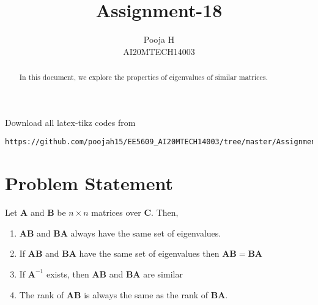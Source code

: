 \documentclass[journal,12pt,twocolumn]{IEEEtran}
\begin{document}
	\makeatother
	\let\StandardTheFigure\thefigure
	\let\vec\mathbf
	\renewcommand{\thefigure}{\theproblem}
	\def\putbox#1#2#3{\makebox[0in][l]{\makebox[#1][l]{}\raisebox{\baselineskip}[0in][0in]{\raisebox{#2}[0in][0in]{#3}}}}
	\def\rightbox#1{\makebox[0in][r]{#1}}
	\def\centbox#1{\makebox[0in]{#1}}
	\def\topbox#1{\raisebox{-\baselineskip}[0in][0in]{#1}}
	\def\midbox#1{\raisebox{-0.5\baselineskip}[0in][0in]{#1}}
	\vspace{3cm}
	\title{Assignment-18}
	\author{Pooja H \\ AI20MTECH14003}
	\maketitle
	\newpage
	\bigskip
	\renewcommand{\thefigure}{\theenumi}
	\renewcommand{\thetable}{\theenumi}
	\begin{abstract}
		In this document, we explore the properties of eigenvalues of similar matrices.
	\end{abstract}
	Download all latex-tikz codes from 
\begin{lstlisting}
https://github.com/poojah15/EE5609_AI20MTECH14003/tree/master/Assignment_18
\end{lstlisting}
	\section{Problem Statement}

Let $\vec{A}$ and $\vec{B}$ be $n \times n$ matrices over $\vec{C}$. Then,
\begin{enumerate}
	\item $\vec{AB}$ and $\vec{BA}$ always have the same set of eigenvalues.
	\item If $\vec{AB}$ and $\vec{BA}$ have the same set of eigenvalues then $\vec{AB=BA}$
	\item If $\vec{A}^{-1}$ exists, then $\vec{AB}$ and $\vec{BA}$ are similar
	\item The rank of $\vec{AB}$  is always the same as the rank of $\vec{BA}$.
\end{enumerate}
\end{document}
